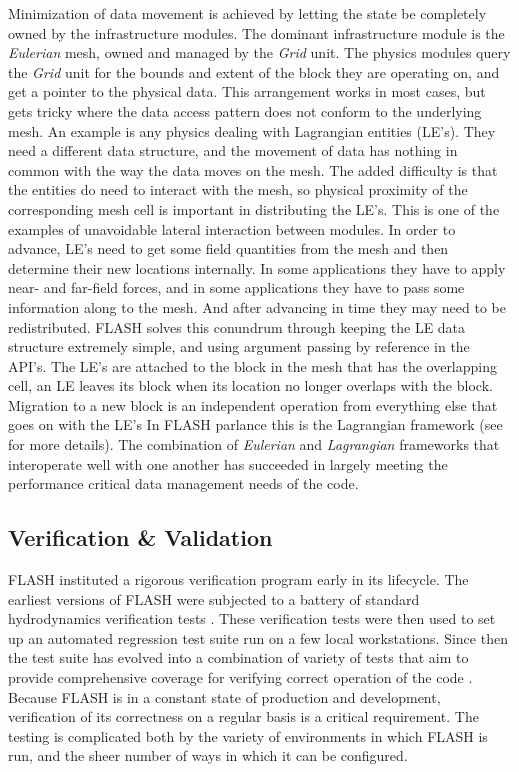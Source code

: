 Minimization of data movement is achieved by letting the state be
completely owned by the infrastructure modules. The dominant
infrastructure module is the {\em Eulerian} mesh, owned and managed by
the {\em Grid} unit. The physics modules query the {\em Grid} unit
for the bounds and extent of the block they are operating on, and
get a pointer to the physical data. This arrangement works in most
cases, but gets tricky where  the data access pattern does not conform
to the underlying mesh. An example is any physics dealing with
Lagrangian entities (LE's). They need a different data structure, and
the movement of data has nothing in common with the way the data moves
on the mesh. The added difficulty is that the entities do need to
interact with the mesh, so physical proximity of the corresponding
mesh cell is important in distributing the LE's. This is one of the
examples of unavoidable lateral interaction between modules. In order
to advance, LE's need to get some field quantities from the mesh and
then determine their new locations internally. In some applications
they have to apply near- and far-field forces, and in some
applications they have to pass some information along to the mesh. And
after advancing in time they may need to be redistributed. FLASH solves
this conundrum through keeping the LE data structure extremely simple,
and using argument passing by reference in the API's. The LE's are
attached to the block in the mesh that has the overlapping cell, an LE
leaves its block when its location no longer overlaps with the
block. Migration to a new block is an independent operation from
everything else that goes on with the LE's In FLASH parlance this is
the Lagrangian framework (see \cite{Dubey2012} for more details). The
combination of {\em Eulerian} and {\em Lagrangian} frameworks that
interoperate well with one another has succeeded in largely meeting the
performance critical data management needs of the code. 

\subsection{Verification \& Validation}
\label{sec:FLASHvandv}

FLASH instituted a rigorous verification program early in its
lifecycle. The earliest versions of FLASH were subjected to
a battery of standard hydrodynamics verification tests
\cite{Fryxell2000}. These verification tests were then used to set up
an automated regression test suite run on a few local
workstations. Since then the test suite has evolved into a
combination of variety of tests that aim to provide comprehensive
coverage for verifying correct operation of the code \cite{Dubey2013,
  Calder2005}. Because FLASH is in a constant state of production and
development, verification of its correctness on a regular basis is a
critical requirement.  The testing is complicated both by the variety 
of environments in which FLASH is run, and the sheer number of ways in
which it can be configured. 

